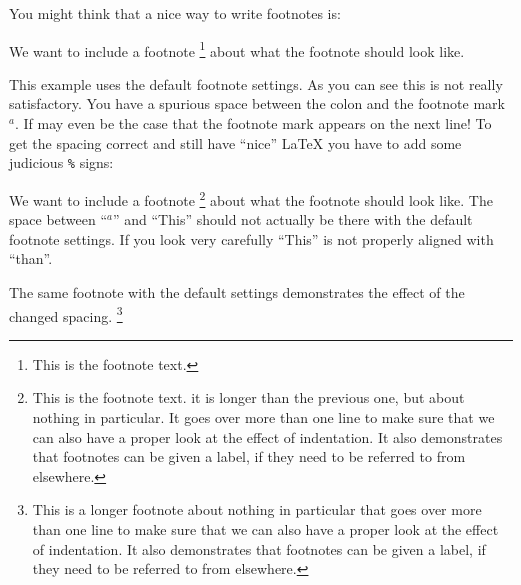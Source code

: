 You might think that a nice way to write footnotes is:
\begin{tcblisting}{}
We want to include a footnote
\footnote{
  This is the footnote text.
}
about what the footnote should look like.
\end{tcblisting}
\noindent
This example uses the default footnote settings.
As you can see this is not really satisfactory. You have a spurious
space between the colon and the footnote mark \(^{a}\). If may even
be the case that the footnote mark appears on the next line! 
To get the spacing
correct and still have \enquote{nice} \LaTeX{} you have to add some
judicious \texttt{\%} signs:
\begin{tcblisting}{}
We want to include a footnote%
\footnote{\label{foot:one}
  This is the footnote text.
  it is longer than the previous one, but about nothing in particular.
  It goes over more than one line to make sure that we can also have a proper
  look at the effect of indentation.
  It also demonstrates that footnotes can be given a label,
  if they need to be referred to from elsewhere.
}
about what the footnote should look like.
The space between \enquote{\(^{a}\)} and \enquote{This} should not actually be there
with the default footnote settings.
If you look very carefully \enquote{This} is not properly aligned with \enquote{than}.
\end{tcblisting}
\begin{tcblisting}{}
The same footnote with the  default settings
demonstrates the effect of the changed spacing.%
\footnote{\label{foot:two}%
  This is a longer footnote about nothing in particular that goes
  over more than one line to make sure that we can also have a proper
  look at the effect of indentation.
  It also demonstrates that footnotes can be given a label,
  if they need to be referred to from elsewhere.
}
\end{tcblisting}

